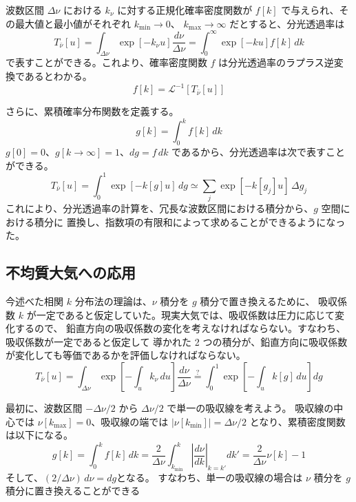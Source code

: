 \documentclass[article,twoside]{dennou777}
\begin{document}
波数区間 $\Delta\nu$ における $k_\nu$ に対する正規化確率密度関数が
$f[k]$ で与えられ、その最大値と最小値がそれぞれ $k_{\mathrm{min}}\to0$、
$k_{\mathrm{max}}\to\infty$ だとすると、分光透過率は
\begin{equation}
	T_{\bar\nu}[u]=\int_{\Delta\nu}\exp[-k_\nu u]\frac{d\nu}{\Delta\nu}
	=\int^\infty_0 \exp[-ku]f[k]\,dk
\end{equation}
で表すことができる。これより、確率密度関数 $f$ は分光透過率のラプラス逆変換であるとわかる。
\begin{equation}
	f[k]=\mathcal{L}^{-1}[T_{\bar\nu}[u]]
\end{equation}

さらに、累積確率分布関数を定義する。
\begin{equation}
	g[k]=\int^k_0 f[k]\,dk
\end{equation}
$g[0]=0$、$g[k\to\infty]=1$、$dg=f\,dk$ であるから、分光透過率は次で表すことができる。
\begin{equation}
	T_{\bar\nu}[u]=\int^1_0 \exp[-k[g]u]\,dg\simeq\sum_j\exp[-k[g_j]u]\,\Delta g_j
\end{equation}
これにより、分光透過率の計算を、冗長な波数区間における積分から、$g$ 空間における積分に
置換し、指数項の有限和によって求めることができるようになった。

\subsection{不均質大気への応用}
今述べた相関 $k$ 分布法の理論は、$\nu$ 積分を $g$ 積分で置き換えるために、
吸収係数 $k$ が一定であると仮定していた。現実大気では、吸収係数は圧力に応じて変化するので、
鉛直方向の吸収係数の変化を考えなければならない。すなわち、吸収係数が一定であると仮定して
導かれた 2 つの積分が、鉛直方向に吸収係数が変化しても等価であるかを評価しなければならない。
\begin{equation}
	T_{\bar\nu}[u]
	=\int_{\Delta\nu}\exp\left[-\int_u k_\nu\,du\right]\frac{d\nu}{\Delta\nu}
	\stackrel{?}{=}\int^1_0\exp\left[-\int_uk[g]\,du\right]dg
\end{equation}

最初に、波数区間 $-\Delta\nu/2$ から $\Delta\nu/2$ で単一の吸収線を考えよう。
吸収線の中心では $\nu[k_{\mathrm{max}}]=0$、吸収線の端では
$|\nu[k_{\mathrm{min}}]|=\Delta\nu/2$ となり、累積密度関数は以下になる。
\begin{equation}
	g[k]=\int^k_0 f[k]\,dk
	=\frac{2}{\Delta\nu}\int^k_{k_{\mathrm{min}}}\left|\frac{d\nu}{dk}\right|_{k=k'}dk'
	=\frac{2}{\Delta\nu}\nu[k]-1
\end{equation}
そして、$(2/\Delta\nu)\,d\nu=dg$となる。
すなわち、単一の吸収線の場合は $\nu$ 積分を $g$ 積分に置き換えることができる
\end{document}
